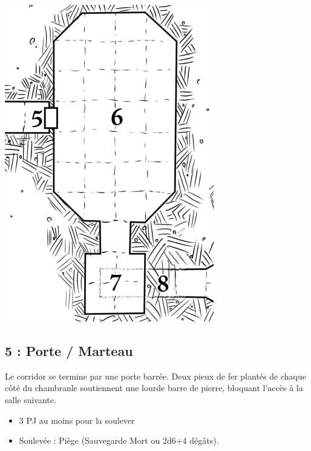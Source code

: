 \newpage
\begin{center}
  \includegraphics[width=\columnwidth]{pics/map_5-8.jpg}
\end{center}

\subsection{5 : Porte / Marteau}\label{n1:s5}
Le corridor se termine par une porte barrée.
Deux pieux de fer plantés de chaque côté du chambranle soutiennent une lourde barre de pierre, bloquant l’accès à la salle suivante.

\begin{itemize}
  \item 3 PJ au moins pour la soulever
  \item Soulevée : Piège (Sauvegarde Mort ou 2d6+4 dégâts).
\end{itemize}

